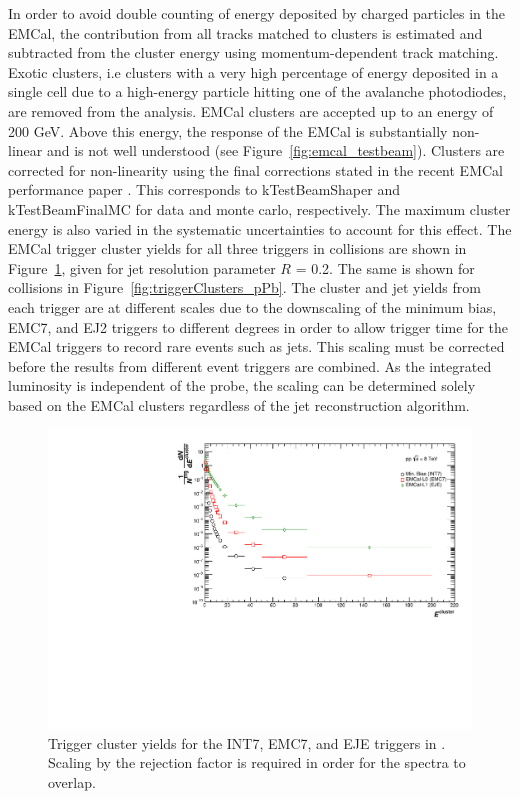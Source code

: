 In order to avoid double counting of energy deposited by charged particles in the EMCal, the contribution from all tracks matched to clusters is estimated and subtracted from the cluster energy using momentum-dependent track matching. Exotic clusters, i.e clusters with a very high percentage of energy deposited in a single cell due to a high-energy particle hitting one of the avalanche photodiodes, are removed from the analysis. EMCal clusters are accepted up to an energy of 200 GeV. Above this energy, the response of the EMCal is substantially non-linear and is not well understood (see Figure~\ref{fig:emcal_testbeam}). Clusters are corrected for non-linearity using the final corrections stated in the recent EMCal performance paper \cite{EMCalPerformance2022}. This corresponds to kTestBeamShaper and kTestBeamFinalMC for data and monte carlo, respectively. The maximum cluster energy is also varied in the systematic uncertainties to account for this effect. The EMCal trigger cluster yields for all three triggers in \pp collisions are shown in Figure~\ref{fig:triggerClusters_pp}, given for jet resolution parameter $R$ = 0.2. The same is shown for \pPb collisions in Figure~\ref{fig:triggerClusters_pPb}. The cluster and jet yields from each trigger are at different scales due to the downscaling of the minimum bias, EMC7, and EJ2 triggers to different degrees in order to allow trigger time for the EMCal triggers to record rare events such as jets. This scaling must be corrected before the results from different event triggers are combined. As the integrated luminosity is independent of the probe, the scaling can be determined solely based on the EMCal clusters regardless of the jet reconstruction algorithm.


\begin{figure}[hbt!]
    \centering
    \includegraphics[width=15cm]{figures/TriggerClusters/clusters_R02.pdf}
    \caption{Trigger cluster yields for the INT7, EMC7, and EJE triggers in \pp. Scaling by the rejection factor is required in order for the spectra to overlap.}
    \label{fig:triggerClusters_pp}
\end{figure}

